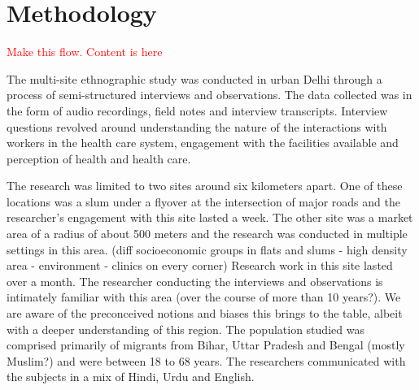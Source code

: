 \section{Methodology}

\begin{comment}
This should tell the story of what you did, and the single most important point is to show that you were reflective, rigorous, ethical, sound in your research. 
Start with where you conducted the study. Was there one site or many? How long was your (the authors’) engagement with this site? What was the nature of the engagement? And remember to anonymize by default.
Say what methods you used and who you studied. How long were your interviews? What kinds of questions did you ask? Did you use an interpreter? Who were these people? How old?
Add a paragraph on who the authors are and what they bring to the table. Say what their biases might have been that could be limitations of this work. Was there access you could not get? 
How did you analyze the data? If you used grounded theory, whose version of grounded theory did you use? Who was responsible for the analysis? 
Finally, there are lots of papers that have a decent write-up for methodology. Find a researcher you like and read up on the Methodology section.
\end{comment}

\textcolor{red}{Make this flow. Content is here}

The multi-site ethnographic study was conducted in urban Delhi through a process of semi-structured interviews and observations. The data collected was in the form of audio recordings, field notes and interview transcripts. Interview questions revolved around understanding the nature of the interactions with workers in the health care system, engagement with the facilities available and perception of health and health care.

The research was limited to two sites around six kilometers apart. One of these locations was a slum under a flyover at the intersection of major roads and the researcher's engagement with this site lasted a week. The other site was a market area of a radius of about 500 meters and the research was conducted in multiple settings in this area. (diff socioeconomic groups in flats and slums - high density area - environment - clinics on every corner) Research work in this site lasted over a month. The researcher conducting the interviews and observations is intimately familiar with this area (over the course of more than 10 years?). We are aware of the preconceived notions and biases this brings to the table, albeit with a deeper understanding of this region. The population studied was comprised primarily of migrants from Bihar, Uttar Pradesh and Bengal (mostly Muslim?) and were between 18 to 68 years. The researchers communicated with the subjects in a mix of Hindi, Urdu and English.

